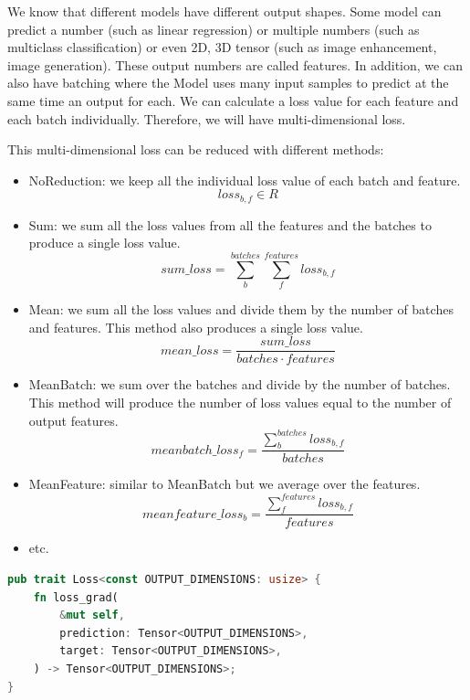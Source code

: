\documentclass[conference]{IEEEtran}
\begin{document}
We know that different models have different output shapes. Some model can predict a number (such as linear regression) or multiple numbers (such as multiclass classification) or even 2D, 3D tensor (such as image enhancement, image generation). 
These output numbers are called features.
In addition, we can also have batching where the Model uses many input samples to predict at the same time an output for each.
We can calculate a loss value for each feature and each batch individually. Therefore, we will have multi-dimensional loss.

This multi-dimensional loss can be reduced with different methods:
\begin{itemize}
    \item NoReduction: we keep all the individual loss value of each batch and feature.
    \begin{equation}
        loss_{b,f} \in R
    \end{equation}
    \item Sum: we sum all the loss values from all the features and the batches to produce a single loss value. 
    \begin{equation}
        sum\_loss = \sum_b^{batches}\sum_f^{features} loss_{b, f}
    \end{equation}
    \item Mean: we sum all the loss values and divide them by the number of batches and features. This method also produces a single loss value.
    \begin{equation}
        mean\_loss = \frac{sum\_loss}{batches\cdot features}
    \end{equation}
    \item MeanBatch: we sum over the batches and divide by the number of batches. This method will produce the number of loss values equal to the number of output features.
    \begin{equation}
        meanbatch\_loss_f = \frac{ \sum_b^{batches} loss_{b,f}}{batches}
    \end{equation}
    \item MeanFeature: similar to MeanBatch but we average over the features.
    \begin{equation}
        meanfeature\_loss_b = \frac{\sum_f^{features} loss_{b,f}}{features}
    \end{equation}
    \item etc.
\end{itemize}

\begin{lstlisting}[language=Rust, caption={Loss Trait}]
pub trait Loss<const OUTPUT_DIMENSIONS: usize> {
    fn loss_grad(
        &mut self,
        prediction: Tensor<OUTPUT_DIMENSIONS>,
        target: Tensor<OUTPUT_DIMENSIONS>,
    ) -> Tensor<OUTPUT_DIMENSIONS>;
}
\end{lstlisting}
\end{document}
